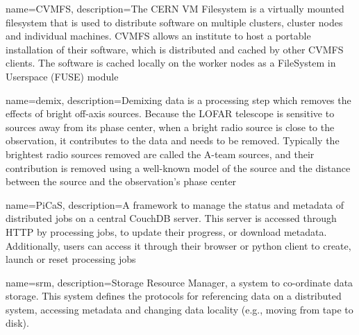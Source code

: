 {
    name=CVMFS,
    description={The CERN VM Filesystem is a virtually mounted filesystem that is used to distribute software on multiple clusters, cluster nodes and individual machines. CVMFS allows an institute to host a portable installation of their software, which is distributed and cached by other CVMFS clients. The software is cached locally on the worker nodes as a FileSystem in Userspace (FUSE) module }
}

{
    name=demix,
    description={Demixing data is a processing step which removes the effects of bright off-axis sources. Because the LOFAR telescope is sensitive to sources away from its phase center, when a bright radio source is close to the observation, it contributes to the data and needs to be removed. Typically the brightest radio sources removed are called the A-team sources, and their contribution is removed using a well-known model of the source and the distance between the source and the observation's phase center 
}}

{
    name=PiCaS,
    description={A framework to manage the status and metadata of distributed jobs on a central \Gls{CouchDB} server. This server is accessed through HTTP by processing jobs, to update their progress, or download metadata. Additionally, users can access it through their browser or python client to create, launch or reset processing jobs }
}

{
    name=srm, 
    description={Storage Resource Manager, a system to co-ordinate data storage. This system defines the protocols for referencing data on a distributed system, accessing metadata and changing data locality (e.g., moving from tape to disk). }
}
